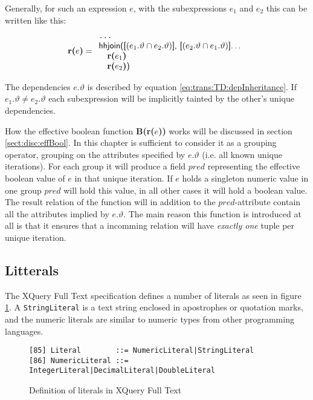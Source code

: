 Generally, for such an expression $e$, with the subexpressions $e_1$ and $e_2$ this can be written
like this:
\begin{equation*}
\mbox{\textbf{r(}}e\mbox{\textbf{)}}=
\begin{array}{l}
\mbox{\texttt{\ldots}} \\
\mbox{\textsf{hhjoin([}}(e_1.\vartheta\cap e_2.\vartheta)\mbox{\textsf{], [}}(e_2.\vartheta\cap e_1.\vartheta)
\mbox{\textsf{]\ldots}} \\ \quad
\mbox{\textbf{r(}}e_1\mbox{\textbf{)}} \\ \quad
\mbox{\textbf{r(}}e_2\mbox{\textbf{)}\textsf{)}}
\end{array}
\end{equation*}

The dependencies $e.\vartheta$ is described by equation \ref{eq:trans:TD:depInheritance}. If $e_{1}.\vartheta \neq
e_{2}.\vartheta$ each subexpression will be implicitly tainted by the other's unique dependencies.

How the effective boolean function \textbf{B(r(}$e$\textbf{))} works will be discussed in section
\ref{sect:disc:effBool}. In this chapter is sufficient to consider it as a grouping operator, grouping on the
attributes specified by $e.\vartheta$ (i.e. all known unique iterations). For each group it will produce a field
$pred$ representing the effective boolean value of $e$ in that unique iteration. If $e$ holds a singleton numeric
value in one group $pred$ will hold this value, in all other cases it will hold a boolean value. The result
relation of the function will in addition to the $pred$-attribute contain all the attributes implied by
$e.\vartheta$. The main reason this function is introduced at all is that it ensures that a incomming relation
will have \emph{exactly one} tuple per unique iteration.

\subsection{Litterals}
\label{sect:trans:TD:litteral}

The XQuery Full Text specification\cite{w3c01} defines a number of literals as seen in figure
\ref{fig:trans:TD:litEBNF}. A \texttt{StringLiteral} is a text string enclosed in apostrophes or quotation marks,
and the numeric literals are similar to numeric types from other programming languages. 

\begin{figure}[h]
\begin{Verbatim}
[85] Literal        ::= NumericLiteral|StringLiteral
[86] NumericLiteral ::= IntegerLiteral|DecimalLiteral|DoubleLiteral
\end{Verbatim}
\caption[Literals in XQuery]{Definition of literals in XQuery Full Text}
\label{fig:trans:TD:litEBNF}
\end{figure}

